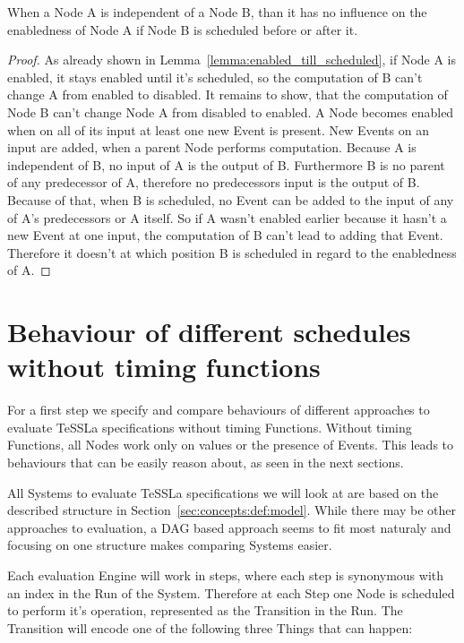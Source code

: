 \begin{lemma}
When a Node A is independent of a Node B, than it has no influence on the enabledness of Node A if Node B is scheduled before or after it.
\label{lemma:independence}
\end{lemma}
\begin{proof}
  As already shown in Lemma~\ref{lemma:enabled_till_scheduled}, if Node A is enabled, it stays enabled until it's scheduled, so the computation of B can't change A from enabled to disabled.
  It remains to show, that the computation of Node B can't change Node A from disabled to enabled.
  A Node becomes enabled when on all of its input at least one new Event is present.
  New Events on an input are added, when a parent Node performs computation.
  Because A is independent of B, no input of A is the output of B.
  Furthermore B is no parent of any predecessor of A, therefore no predecessors input is the output of B.
  Because of that, when B is scheduled, no Event can be added to the input of any of A's predecessors or A itself.
  So if A wasn't enabled earlier because it hasn't a new Event at one input, the computation of B can't lead to adding that Event.
  Therefore it doesn't at which position B is scheduled in regard to the enabledness of A.
\end{proof}

\section{Behaviour of different schedules without timing functions}
\label{sec:concepts:behaviour_without_timing}

For a first step we specify and compare behaviours of different approaches to evaluate TeSSLa specifications without timing Functions.
Without timing Functions, all Nodes work only on values or the presence of Events.
This leads to behaviours that can be easily reason about, as seen in the next sections.

All Systems to evaluate TeSSLa specifications we will look at are based on the described structure in Section~\ref{sec:concepts:def:model}.
While there may be other approaches to evaluation, a DAG based approach seems to fit most naturaly and focusing on one structure makes comparing Systems easier.

Each evaluation Engine will work in steps, where each step is synonymous with an index in the Run of the System.
Therefore at each Step one Node is scheduled to perform it's operation, represented as the Transition in the Run.
The Transition will encode one of the following three Things that can happen:

